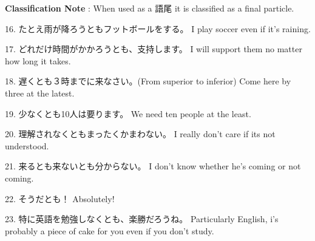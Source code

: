 \par{\textbf{Classification Note }: When used as a 語尾 it is classified as a final particle. }

\par{16. たとえ雨が降ろうともフットボールをする。 \hfill\break
I play soccer even if it's raining. }

\par{17. どれだけ時間がかかろうとも、支持します。 \hfill\break
I will support them no matter how long it takes. }

\par{18. 遅くとも３時までに来なさい。(From superior to inferior) \hfill\break
Come here by three at the latest. }

\par{19. 少なくとも10人は要ります。 \hfill\break
We need ten people at the least. \hfill\break
}

\par{20. 理解されなくともまったくかまわない。 \hfill\break
I really don't care if its not understood. \hfill\break
}

\par{21. 来るとも来ないとも分からない。 \hfill\break
I don't know whether he's coming or not coming. }

\par{22. そうだとも！ \hfill\break
Absolutely! }

\par{23. 特に英語を勉強しなくとも、楽勝だろうね。 \hfill\break
Particularly English, i's probably a piece of cake for you even if you don't study. }
    